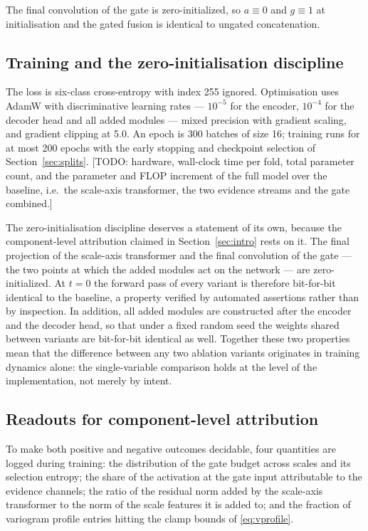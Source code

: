 \documentclass[preprint,12pt,authoryear]{elsarticle}
\begin{document}
The final convolution of the gate is zero-initialized, so $a \equiv 0$ and
$g \equiv 1$ at initialisation and the gated fusion is identical to ungated
concatenation.

\subsection{Training and the zero-initialisation discipline}
\label{sec:training}

The loss is six-class cross-entropy with index 255 ignored. Optimisation uses
AdamW \citep{loshchilov2019adamw} with discriminative learning rates ---
$10^{-5}$ for the encoder, $10^{-4}$ for the decoder head and all added modules
--- mixed precision with gradient scaling, and gradient clipping at 5.0. An
epoch is 300 batches of size 16; training runs for at most 200 epochs with the
early stopping and checkpoint selection of Section~\ref{sec:splits}.
[TODO: hardware, wall-clock time per fold, total parameter count, and the
parameter and FLOP increment of the full model over the baseline, i.e.\ the
scale-axis transformer, the two evidence streams and the gate combined.]

The zero-initialisation discipline deserves a statement of its own, because the
component-level attribution claimed in Section~\ref{sec:intro} rests on it. The
final projection of the scale-axis transformer and the final convolution of the
gate --- the two points at which the added modules act on the network --- are
zero-initialized. At $t=0$ the forward pass of every variant is therefore
bit-for-bit identical to the baseline, a property verified by automated
assertions rather than by inspection. In addition, all added modules are
constructed after the encoder and the decoder head, so that under a fixed random
seed the weights shared between variants are bit-for-bit identical as well.
Together these two properties mean that the difference between any two
ablation variants originates in training dynamics alone: the single-variable
comparison holds at the level of the implementation, not merely by intent.

\subsection{Readouts for component-level attribution}
\label{sec:readouts}

To make both positive and negative outcomes decidable, four quantities are
logged during training: the distribution of the gate budget across scales and
its selection entropy; the share of the activation at the gate input
attributable to the evidence channels; the ratio of the residual norm added by
the scale-axis transformer to the norm of the scale features it is added to; and
the fraction of variogram profile entries hitting the clamp bounds of
\eqref{eq:vprofile}.
\end{document}
